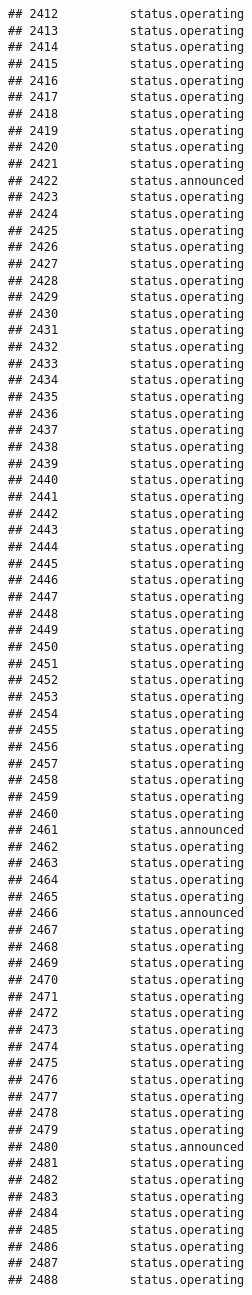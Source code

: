 \documentclass[
]{article}
\begin{document}
\begin{verbatim}
## 2412          status.operating
## 2413          status.operating
## 2414          status.operating
## 2415          status.operating
## 2416          status.operating
## 2417          status.operating
## 2418          status.operating
## 2419          status.operating
## 2420          status.operating
## 2421          status.operating
## 2422          status.announced
## 2423          status.operating
## 2424          status.operating
## 2425          status.operating
## 2426          status.operating
## 2427          status.operating
## 2428          status.operating
## 2429          status.operating
## 2430          status.operating
## 2431          status.operating
## 2432          status.operating
## 2433          status.operating
## 2434          status.operating
## 2435          status.operating
## 2436          status.operating
## 2437          status.operating
## 2438          status.operating
## 2439          status.operating
## 2440          status.operating
## 2441          status.operating
## 2442          status.operating
## 2443          status.operating
## 2444          status.operating
## 2445          status.operating
## 2446          status.operating
## 2447          status.operating
## 2448          status.operating
## 2449          status.operating
## 2450          status.operating
## 2451          status.operating
## 2452          status.operating
## 2453          status.operating
## 2454          status.operating
## 2455          status.operating
## 2456          status.operating
## 2457          status.operating
## 2458          status.operating
## 2459          status.operating
## 2460          status.operating
## 2461          status.announced
## 2462          status.operating
## 2463          status.operating
## 2464          status.operating
## 2465          status.operating
## 2466          status.announced
## 2467          status.operating
## 2468          status.operating
## 2469          status.operating
## 2470          status.operating
## 2471          status.operating
## 2472          status.operating
## 2473          status.operating
## 2474          status.operating
## 2475          status.operating
## 2476          status.operating
## 2477          status.operating
## 2478          status.operating
## 2479          status.operating
## 2480          status.announced
## 2481          status.operating
## 2482          status.operating
## 2483          status.operating
## 2484          status.operating
## 2485          status.operating
## 2486          status.operating
## 2487          status.operating
## 2488          status.operating

\end{verbatim}
\end{document}
